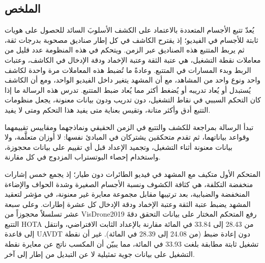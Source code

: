 \documentclass[12pt,a4paper]{article}
\begin{document}
\begin{otherlanguage}{arabic}
\section*{\LARGE الملخص}
\thispagestyle{empty}

يُعدّ تتبع الأجسام المتعددة بالاعتماد على الكشف الأسلوبَ السائد للحصول على هويات ثابتة للأجسام في الفيديو؛ إذ يقترح الكاشف في كل إطار صناديق مصحوبة بدرجات ثقة، ثم يربط المتتبع هذه الصناديق عبر الزمن. ويتحكم في هذه المنظومة عدد قليل من معاملات نقطة التشغيل، هي عتبة الثقة وعتبة الإخماد ودقة الإدخال في الكاشف، وعتبات الربط وبدء المسارات في المتتبع. وعادةً ما تُضبط هذه المعاملات مرة واحدة لكاشف واحد ونوع واحد من المشاهد، مع أن المشهد يتغير داخل الفيديو الواحد، ومع أن الكاشف يُستبدل أو يُعاد تدريبه أو يُضغط أكثر مما يُعاد ضبط المتتبع. تدرس هذه الرسالة ما إذا كان التحكم السببي في نقاط التشغيل، دون تدريب ودون بيانات معنونة، يجعل منظومات التتبع أدق وأكثر متانة، وتقيس بعناية متى يفيد هذا التحكم ومتى لا يفيد.

تبدأ الرسالة بمراجعة للكشف والتتبع في الزمن الحقيقي ونماذجهما ومقاييس تقييمهما وقواعد بياناتهما، ثم تقدم متحكمَين يشتركان في المبادئ نفسها: لا أوزان متعلَّمة، ولا بيانات معنونة أثناء التشغيل، وتجميد الإعداد قبل أي تقييم على بيانات محجوزة، واستخدام إحصاء البوتستراب المزدوج في كل مقارنة.

المتحكم الأول متكيف مع المشهد في فيديو الطائرات دون طيار؛ إذ يجمع خمس إشارات منخفضة التكلفة، هي كثافة الكشوف ونسبة الأجسام الصغيرة وشدة الحواف والإضاءة المنخفضة والضبابية، بعد ترتيبها مقابل مجموعة معايرة غير معنونة، في مؤشر لتعقيد المشهد يضبط عتبة الثقة وعتبة الإخماد ودقة الإدخال كل عشرة إطارات. وعلى سبعة عشر تسلسلاً محجوزاً من \foreignlanguage{english}{VisDrone2019} رفع المتحكم المختار على بيانات التحقق دقةَ التتبع \foreignlanguage{english}{HOTA} من \foreignlanguage{english}{28.43} إلى \foreignlanguage{english}{33.84} في المائة مقارنة بالإعداد الثابت الافتراضي، وانتقل إلى قاعدة \foreignlanguage{english}{UAVDT} دون إعادة ضبط (من \foreignlanguage{english}{24.08} إلى \foreignlanguage{english}{28.39} في المائة). غير أن نقطة تشغيل ثابتة مطابقة بلغت \foreignlanguage{english}{33.93} في المائة، مما يبيّن أن المكسب ناتج عن معايرة نقطة التشغيل على بيانات جوية تمثيلية لا عن التبديل من إطار إلى آخر.


\end{otherlanguage}
\end{document}
